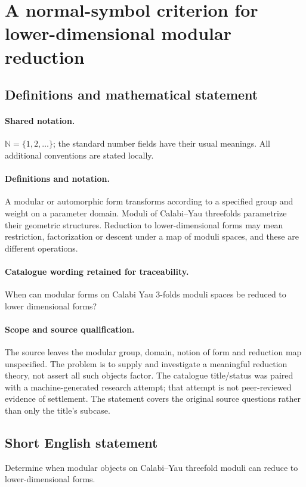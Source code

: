 \documentclass[11pt]{article}
\begin{document}
\section{A normal-symbol criterion for lower-dimensional modular reduction}\label{statement}

\subsection{Definitions and mathematical statement}

\paragraph{Shared notation.}$\mathbb N=\{1,2,\ldots\}$; the standard number fields have their usual meanings. All additional conventions are stated locally.


\paragraph{Definitions and notation.}A modular or automorphic form transforms according to a specified group and weight on a parameter domain. Moduli of Calabi--Yau threefolds parametrize their geometric structures. Reduction to lower-dimensional forms may mean restriction, factorization or descent under a map of moduli spaces, and these are different operations.

\paragraph{Catalogue wording retained for traceability.}
When can modular forms on Calabi Yau 3-folds moduli spaces be reduced to lower dimensional forms?
\paragraph{Scope and source qualification.}The source leaves the modular group, domain, notion of form and reduction map unspecified. The problem is to supply and investigate a meaningful reduction theory, not assert all such objects factor. The catalogue title/status was paired with a machine-generated research attempt; that attempt is not peer-reviewed evidence of settlement. The statement covers the original source questions rather than only the title’s subcase.
\subsection{Short English statement}
Determine when modular objects on Calabi–Yau threefold moduli can reduce to lower-dimensional forms.
\end{document}
